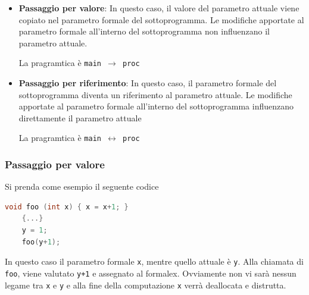 \begin{itemize}
    \item \textbf{Passaggio per valore}: In questo caso, il valore del parametro attuale viene copiato nel parametro formale del sottoprogramma. Le modifiche apportate al parametro formale all'interno del sottoprogramma non influenzano il parametro attuale.
    
    La pragramtica è \texttt{main $\to$ proc}


    \item \textbf{Passaggio per riferimento}: In questo caso, il parametro formale del sottoprogramma diventa un riferimento al parametro attuale. Le modifiche apportate al parametro formale all'interno del sottoprogramma influenzano direttamente il parametro attuale
    
    La pragramtica è \texttt{main $\leftrightarrow$ proc}
    
\end{itemize}

\subsubsection{Passaggio per valore}
Si prenda come esempio il seguente codice

\begin{lstlisting}[language=C]
    void foo (int x) { x = x+1; }
    {...}
    y = 1;
    foo(y+1);
\end{lstlisting}

In questo caso il parametro formale \texttt{x}, mentre quello attuale è \texttt{y}. Alla chiamata di \texttt{foo}, viene valutato \texttt{y+1} e assegnato al formale{x}. Ovviamente non vi sarà nessun legame tra \texttt{x} e \texttt{y} e alla fine della computazione \texttt{x} verrà deallocata e distrutta.


